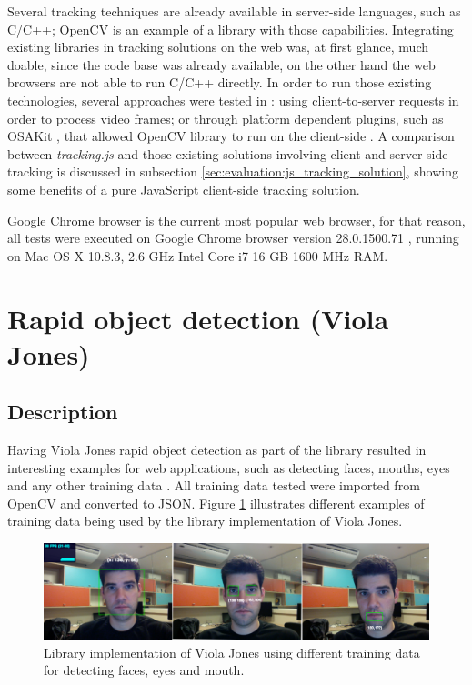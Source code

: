 Several tracking techniques are already available in server-side languages, such as C/C++; OpenCV is an example of a library with those capabilities. Integrating existing libraries in tracking solutions on the web was, at first glance, much doable, since the code base was already available, on the other hand the web browsers are not able to run C/C++ directly. In order to run those existing technologies, several approaches were tested in \cite{Pablo2013}: using client-to-server requests in order to process video frames; or through platform dependent plugins, such as OSAKit \cite{OSAKit2013}, that allowed OpenCV library to run on the client-side \cite{Pablo2013}. A comparison between \textit{tracking.js} and those existing solutions involving client and server-side tracking is discussed in subsection \ref{sec:evaluation:js_tracking_solution}, showing some benefits of a pure JavaScript client-side tracking solution.

Google Chrome browser is the current most popular web browser, for that reason, all tests were executed on Google Chrome browser version 28.0.1500.71 \cite{Chrome2010}, running on Mac OS X 10.8.3, 2.6 GHz Intel Core i7 16 GB 1600 MHz RAM.


\section{Rapid object detection (Viola Jones)} %
\label{sec:evaluation:results:rapid_object_detection}

\subsection{Description} %
\label{sub:evaluation:rapid_object_detection:description}

Having Viola Jones rapid object detection as part of the library resulted in interesting examples for web applications, such as detecting faces, mouths, eyes and any other training data \cite{Viola2001}. All training data tested were imported from OpenCV and converted to JSON. Figure \ref{figure:viola_overview} illustrates different examples of training data being used by the library implementation of Viola Jones.

\begin{figure}[!htb]
  \centering
  \includegraphics[width=\linewidth]{chapters/evaluation/viola_overview.png}
  \caption{Library implementation of Viola Jones using different training data for detecting faces, eyes and mouth.}
  \label{figure:viola_overview}
\end{figure}

